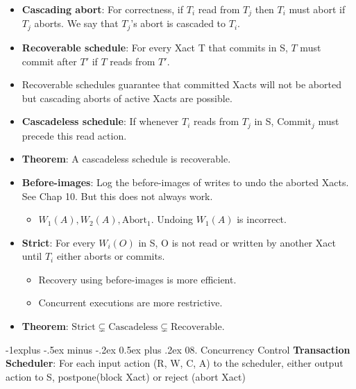 \documentclass[8pt, landscape]{extarticle}
\makeatletter
\renewcommand{\subsection}{\@startsection{subsection}{2}{0mm}%
  {-1explus -.5ex minus -.2ex}%
  {0.5ex plus .2ex}%
{\normalfont\normalsize\bfseries}}
\makeatother
\begin{document}
\begin{multicols*}{4}
  \begin{itemize}
    \item \textbf{Cascading abort}: For correctness, if $T_i$ read from $T_j$ then $T_i$ must abort if $T_j$ aborts. We say that $T_j$'s abort is cascaded to $T_i$.
    \item \textbf{Recoverable schedule}: For every Xact T that commits in S, $T$ must commit after $T'$ if $T$ reads from $T'$.
    \item Recoverable schedules guarantee that committed Xacts will not be aborted but cascading aborts of active Xacts are possible.
    \item \textbf{Cascadeless schedule}: If whenever $T_i$ reads from $T_j$ in S, $\text{Commit}_j$ must precede this read action.
    \item \textbf{Theorem}: A cascadeless schedule is recoverable.
    \item \textbf{Before-images}: Log the before-images of writes to undo the aborted Xacts. See Chap 10. But this does not always work.
    \begin{itemize}
      \item $W_1(A), W_2(A), \text{Abort}_1$. Undoing $W_1(A)$ is incorrect.
    \end{itemize} 
    \item \textbf{Strict}: For every $W_i(O)$ in S, O is not read or written by another Xact until $T_i$ either aborts or commits.
    \begin{itemize}
      \item Recovery using before-images is more efficient.
      \item Concurrent executions are more restrictive.
    \end{itemize}
    \item \textbf{Theorem}: $\text{Strict} \subsetneq \text{Cascadeless} \subsetneq \text{Recoverable}$.
  \end{itemize}

  \subsection{08. Concurrency Control}
  \textbf{Transaction Scheduler}: For each input action (R, W, C, A) to the scheduler, either output action to S, postpone(block Xact) or reject (abort Xact)


\end{multicols*}
\end{document}

